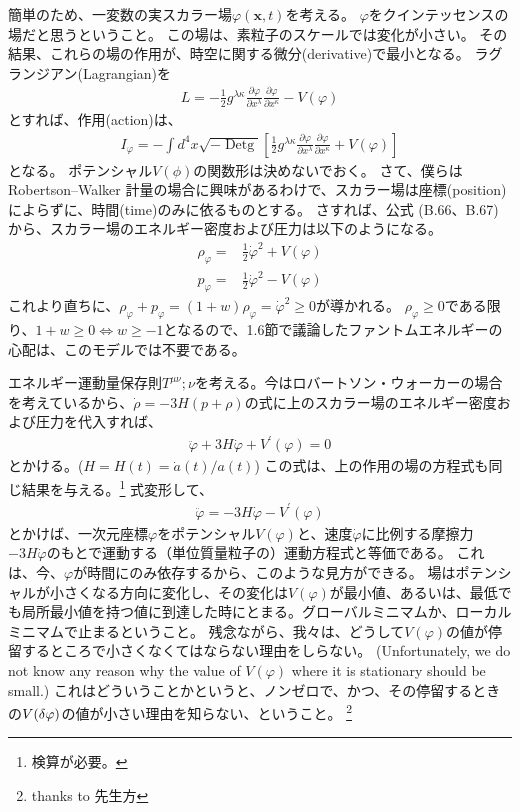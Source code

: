 \documentclass[11pt]{ltjsarticle}
\theoremstyle{plain}
\theoremstyle{break}
\newcommand{\mbfx}{\mathbf{x}}
\begin{document}
簡単のため、一変数の実スカラー場$\varphi(\mbfx,t)$を考える。
$\varphi$をクインテッセンスの場だと思うということ。
この場は、素粒子のスケールでは変化が小さい。
その結果、これらの場の作用が、時空に関する微分(derivative)で最小となる。
ラグランジアン(Lagrangian)を
\begin{align}
  L = - \frac{1}{2} g^{\lambda \kappa} \frac{\partial \varphi}{\partial x^{\lambda}} \frac{\partial \varphi}{\partial x^{\kappa}}-V(\varphi)
\end{align}%
とすれば、作用(action)は、
\begin{align}
  I_{\varphi}=-\int d^{4} x \sqrt{-\operatorname{Detg}}\left[\frac{1}{2} g^{\lambda \kappa} \frac{\partial \varphi}{\partial x^{\lambda}} \frac{\partial \varphi}{\partial x^{\kappa}}+V(\varphi)\right]
\end{align}%
となる。
ポテンシャル$V(\phi)$の関数形は決めないでおく。
さて、僕らはRobertson–Walker 計量の場合に興味があるわけで、スカラー場は座標(position)によらずに、時間(time)のみに依るものとする。
さすれば、公式 (B.66、B.67) から、スカラー場のエネルギー密度および圧力は以下のようになる。
\begin{align}
  \rho_{\varphi}=&\frac{1}{2} \dot{\varphi}^{2}+V(\varphi) \label{eq:1.12.2}\\
   p_{\varphi}=&\frac{1}{2} \dot{\varphi}^{2}-V(\varphi) \label{eq:1.12.3}
\end{align}%
これより直ちに、$\rho_{\varphi}+p_{\varphi} = (1+w)\rho_{\varphi}  = \dot{\varphi}^2 \geq 0$が導かれる。
$\rho_{\varphi}\geq 0 $である限り、$1+w\geq0  \Leftrightarrow w \geq -1$となるので、1.6節で議論したファントムエネルギーの心配は、このモデルでは不要である。

エネルギー運動量保存則$T^{\mu\nu}{;\nu}$を考える。今はロバートソン・ウォーカーの場合を考えているから、$\dot{\rho} = -3H (p+\rho)$の式に上のスカラー場のエネルギー密度および圧力を代入すれば、
\begin{align}
  \ddot{\varphi}+3 H \dot{\varphi}+V^{\prime}(\varphi)=0 \label{eq:1.12.4}
\end{align}%
とかける。($H=H(t)=\dot{a}(t)/a(t)$)
この式は、上の作用の場の方程式も同じ結果を与える。\footnote{検算が必要。}
式変形して、
\begin{align}
  \ddot{\varphi}=-3 H \dot{\varphi}-  V^{\prime}(\varphi)
\end{align}%
とかけば、一次元座標$\varphi$をポテンシャル$V(\varphi)$と、速度$\dot{\varphi}$に比例する摩擦力$-3H\dot{\varphi}$のもとで運動する（単位質量粒子の）運動方程式と等価である。
これは、今、$\varphi$が時間にのみ依存するから、このような見方ができる。
場はポテンシャルが小さくなる方向に変化し、その変化は$V(\varphi)$が最小値、あるいは、最低でも局所最小値を持つ値に到達した時にとまる。グローバルミニマムか、ローカルミニマムで止まるということ。
残念ながら、我々は、どうして$V(\varphi)$の値が停留するところで小さくなくてはならない理由をしらない。
(Unfortunately, we do not know any reason why the value of $V(\varphi)$ where it is stationary should be small.)
これはどういうことかというと、ノンゼロで、かつ、その停留するときの$V(\var{\varphi})$の値が小さい理由を知らない、ということ。
\footnote{thanks to 先生方}
\end{document}

